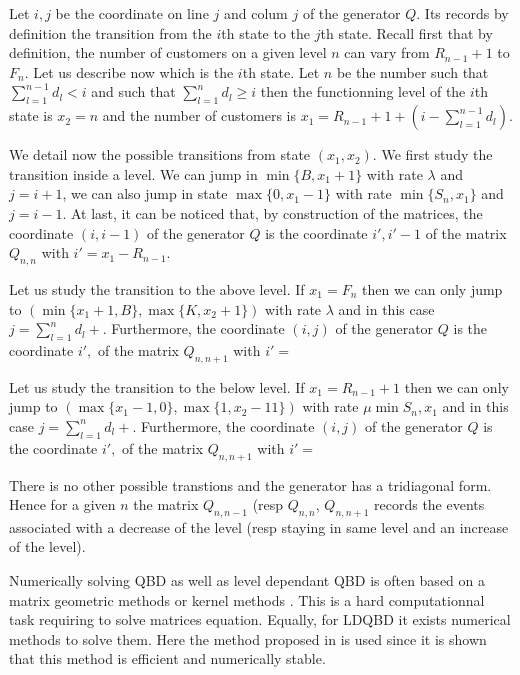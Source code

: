 \documentclass[conference]{IEEEtran}
\begin{document}
\begin{IEEEproof}
Let $i,j$ be the coordinate on line $j$ and colum $j$ of the generator $Q$. Its records by definition the transition
from the $i$th state to the $j$th state.
Recall first that by definition, the number of customers on a given level $n$ can vary from $R_{n-1}+1$ to $F_n$. 
Let us describe now which is the $i$th state. Let $n$ be the number such that
$\sum_{l=1}^{n-1} d_l <i$ and such that $\sum_{l=1}^{n} d_l  \geq i$ then the functionning level of the $i$th state is
$x_2=n$ and the number of customers is $x_1=R_{n-1}+1+\left(i-\sum_{l=1}^{n-1} d_l\right)$.

We detail now the possible transitions from state $(x_1,x_2)$.
We first study the transition inside a level. We can jump in $\min\{B,x_1+1\}$ with rate $\lambda$ and $j=i+1$,
we can also jump in state $\max\{0,x_1-1\}$ with rate $\min\{S_n,x_1\}$ and $j=i-1$.
At last, it can be noticed that, by construction of the matrices, the coordinate $(i,i-1)$ of the generator $Q$
is the coordinate $i',i'-1$ of the matrix $Q_{n,n}$ with $i'=x_1-R_{n-1}$.

Let us study the transition to the above level. If $x_1=F_n$ then 
we can only jump to $(\min\{x_1+1,B\},\max\{K,x_2+1\})$ with rate $\lambda$ and in this case $j=\sum_{l=1}^{n} d_l +  $.
Furthermore, the coordinate $(i,j)$ of the generator $Q$
is the coordinate $i',$ of the matrix $Q_{n,n+1}$ with $i'=$

Let us study the transition to the below level. If $x_1=R_{n-1}+1$ then 
we can only jump to $(\max\{x_1-1,0\},\max\{1,x_2-11\})$ with rate $\mu \min{S_n,x_1}$ and in this case $j=\sum_{l=1}^{n} d_l +  $.
Furthermore, the coordinate $(i,j)$ of the generator $Q$
is the coordinate $i',$ of the matrix $Q_{n,n+1}$ with $i'=$


There is no other possible transtions and the generator has a tridiagonal form.
Hence for a given $n$ the matrix $Q_{n,n-1}$ (resp $Q_{n,n}$, $Q_{n,n+1}$
records the events associated with a decrease of the level (resp staying in same level and an increase of the level).
\end{IEEEproof}

Numerically solving QBD as well as level dependant QBD is often based on a matrix geometric methods 
\cite{Neuts1981,art:latoucherama} or kernel methods \cite{gaujal2006optimal}. This is a hard computationnal task requiring to solve
matrices equation. Equally, for LDQBD it exists numerical methods to solve them. Here the method proposed in  \cite{baumann2010numerical} is used
since it is shown that this method is efficient and numerically stable.
\end{document}
